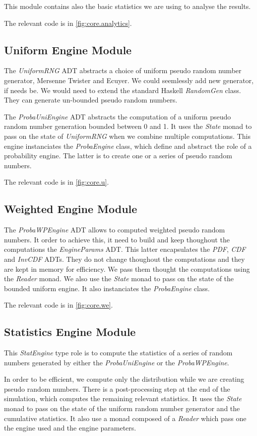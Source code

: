 \documentclass[12pt,a4paper,article]{memoir} %
\begin{document}
This module contains also the basic statistics we are using to 
analyse the results.

The relevant code is in \autoref{fig:core.analytics}.
\subsection{Uniform Engine Module}
\label{ssec:uniform.impl}
The \emph{UniformRNG} ADT abstracts a choice of uniform pseudo random 
number generator, Mersenne Twister and Ecuyer. We could seemlessly
add new generator, if needs be. We would need to extend the standard
Haskell \emph{RandomGen} class. 
They can generate un-bounded pseudo random numbers.

The \emph{ProbaUniEngine} ADT abstracts the computation of a uniform pseudo
random number generation bounded between 0 and 1.
It uses the \emph{State} monad to pass on the state of \emph{UniformRNG}
when we combine multiple computations.
This engine instanciates the \emph{ProbaEngine} class, which define
and abstract the role of a probability engine. The latter is to 
create one or a series of pseudo random numbers.

The relevant code is in \autoref{fig:core.u}.
\subsection{Weighted Engine Module}
\label{ssec:weighted.impl}
The \emph{ProbaWPEngine} ADT allows to computed weighted pseudo
random numbers. It order to achieve this, it need to build and keep
thoughout the computations the \emph{EngineParams} ADT. 
This latter encapsulates the \emph{PDF}, \emph{CDF} and \emph{InvCDF}
ADTs. They do not change thoughout the computations and they are kept 
in memory for efficiency. We pass them thought the computations
using the \emph{Reader} monad. We also use the \emph{State} monad
to pass on the state of the bounded uniform engine.
It also instanciates the \emph{ProbaEngine} class.

The relevant code is in \autoref{fig:core.we}.
\subsection{Statistics Engine Module}
\label{ssec:stats.impl}
This \emph{StatEngine} type role is
to compute the statistics of a series of random numbers generated
by either the \emph{ProbaUniEngine} or the \emph{ProbaWPEngine}.

In order to be efficient, we compute only the distribution while we 
are creating pseudo random numbers. 
There is a post-processing step at the end of the simulation, which 
computes the remaining relevant statistics.
It uses the \emph{State} monad to pass on the state of the 
uniform random number generator and the cumulative statistics.
It also use a monad composed of a \emph{Reader} which
pass one the engine used and the engine parameters. 
\end{document}
